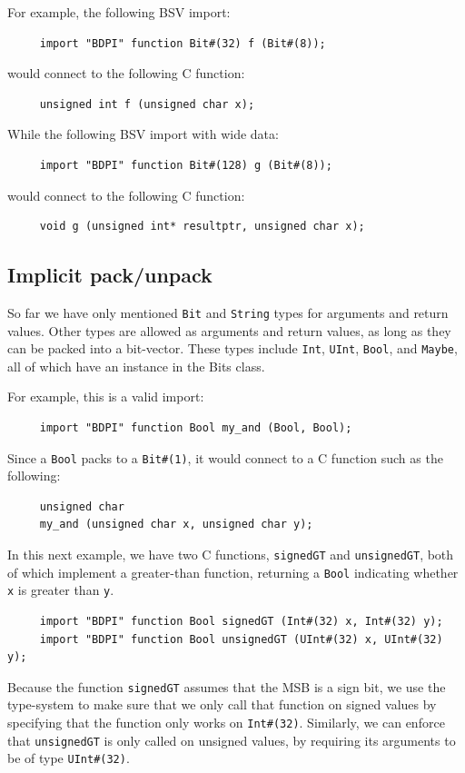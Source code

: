 \documentclass[twoside,letterpaper]{article}
\newcommand{\te}[1]{\texttt{#1}}
\begin{document}
For example, the following BSV import:
\begin{verbatim}
     import "BDPI" function Bit#(32) f (Bit#(8));
\end{verbatim}
would connect to the following C function:
\begin{verbatim}
     unsigned int f (unsigned char x);
\end{verbatim}
While the following BSV import with wide data:
\begin{verbatim}
     import "BDPI" function Bit#(128) g (Bit#(8));
\end{verbatim}
would connect to the following C function:
\begin{verbatim}
     void g (unsigned int* resultptr, unsigned char x);
\end{verbatim}


\subsection{Implicit pack/unpack}

So far we have only mentioned \te{Bit} and \te{String} types for arguments and
return  values. Other types are allowed as arguments and return
values, as  long as they can be packed into a bit-vector.  These types
include \te{Int}, \te{UInt},
\te{Bool}, and \te{Maybe}, all of which have an 
 instance in the Bits class.  

For example, this is a valid import:
\begin{verbatim}
     import "BDPI" function Bool my_and (Bool, Bool);
\end{verbatim}
Since a \te{Bool} packs to a \te{Bit\#(1)}, it
 would connect to a C function such as the following:
\begin{verbatim} 
     unsigned char
     my_and (unsigned char x, unsigned char y);
\end{verbatim}

In this next example, we have two C functions, \te{signedGT} and
\te{unsignedGT},  both of which  implement a greater-than
function, returning a \te{Bool} indicating whether \te{x} is greater
than \te{y}.
\begin{verbatim}
     import "BDPI" function Bool signedGT (Int#(32) x, Int#(32) y);
     import "BDPI" function Bool unsignedGT (UInt#(32) x, UInt#(32) y);
\end{verbatim}
 Because
the  function \te{signedGT} assumes that the MSB is a sign bit, we use
the  type-system to make sure that we only call that function on
signed  values by specifying  that the function only works on
\te{Int\#(32)}.  Similarly, we can enforce that \te{unsignedGT} is
only called  on unsigned values, by requiring its  arguments
to be of  type \te{UInt\#(32)}.
\end{document}
